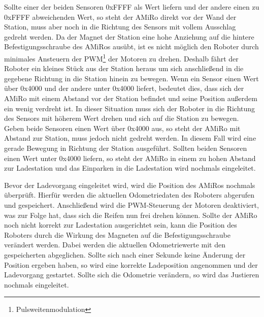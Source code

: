 Sollte einer der beiden Sensoren 0xFFFF als Wert liefern und der andere einen zu 0xFFFF abweichenden Wert, so steht der AMiRo direkt vor der Wand der Station, muss aber noch in die Richtung des Sensors mit vollem Ausschlag gedreht werden. Da der Magnet der Station eine hohe Anziehung auf die hintere Befestigungsschraube des AMiRos ausübt, ist es nicht möglich den Roboter durch minimales Ansteuern der PWM\footnote{Pulsweitenmodulation} der Motoren zu drehen. Deshalb fährt der Roboter ein kleines Stück aus der Station heraus um sich anschließend in die gegebene Richtung in die Station hinein zu bewegen. 
Wenn ein Sensor einen Wert über 0x4000 und der andere unter 0x4000 liefert, bedeutet dies, dass sich der AMiRo mit einem Abstand vor der Station befindet und seine Position außerdem ein wenig verdreht ist. In dieser Situation muss sich der Roboter in die Richtung des Sensors mit höherem Wert drehen und sich auf die Station zu bewegen. 
Geben beide Sensoren einen Wert über 0x4000 aus, so steht der AMiRo mit Abstand zur Station, muss jedoch nicht gedreht werden. In diesem Fall wird eine gerade Bewegung in Richtung der Station ausgeführt. 
Sollten beiden Sensoren einen Wert unter 0x4000 liefern, so steht der AMiRo in einem zu hohen Abstand zur Ladestation und das Einparken in die Ladestation wird nochmals eingeleitet.

Bevor der Ladevorgang eingeleitet wird, wird die Position des AMiRos nochmals überprüft. Hierfür werden die aktuellen Odometriedaten des Roboters abgerufen und gespeichert. Anschließend wird die PWM-Steuerung der Motoren deaktiviert, was zur Folge hat, dass sich die Reifen nun frei drehen können. Sollte der AMiRo noch nicht korrekt zur Ladestation ausgerichtet sein, kann die Position des Roboters durch die Wirkung des Magneten auf die Befestigungsschraube verändert werden. Dabei werden die aktuellen Odometriewerte mit den gespeicherten abgeglichen. Sollte sich nach einer Sekunde keine Änderung der Position ergeben haben, so wird eine korrekte Ladeposition angenommen und der Ladevorgang gestartet. Sollte sich die Odometrie verändern, so wird das Justieren nochmals eingeleitet. 





